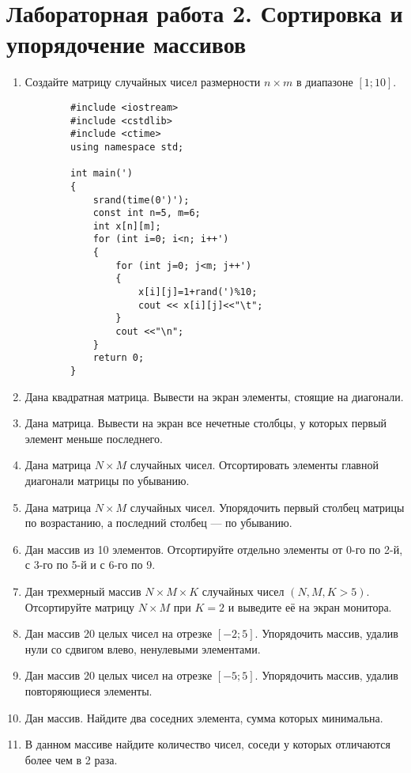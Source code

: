 \section{Лабораторная работа 2. Сортировка и упорядочение массивов}
\begin{enumerate}[leftmargin=*]
    \item Создайте матрицу случайных чисел размерности $n \times m$ в диапазоне $[1;10]$.
    \begin{lstlisting}
        #include <iostream>
        #include <cstdlib>
        #include <ctime>
        using namespace std;

        int main(')
        {
            srand(time(0')');
            const int n=5, m=6;
            int x[n][m];
            for (int i=0; i<n; i++')
            {
                for (int j=0; j<m; j++')
                {
                    x[i][j]=1+rand(')%10;
                    cout << x[i][j]<<"\t";
                }
                cout <<"\n";
            }
            return 0;
        }
    \end{lstlisting}
    \item Дана квадратная матрица. Вывести на экран элементы, стоящие на диагонали.
    \item Дана матрица. Вывести на экран все нечетные столбцы, у которых первый элемент меньше последнего.
    \item Дана матрица $N\times M$ случайных чисел. Отсортировать элементы главной диагонали матрицы по убыванию.
    \item Дана матрица $N\times M$ случайных чисел. Упорядочить первый столбец матрицы по возрастанию, а последний столбец --- по убыванию.
    \item Дан массив из 10 элементов. Отсортируйте отдельно элементы от 0-го по 2-й, с 3-го по 5-й и с 6-го по 9.
    \item Дан трехмерный массив $N\times M\times K$ случайных чисел $(N, M, K>5)$. Отсортируйте матрицу $N\times M$ при $K=2$ и выведите её на экран монитора.
    \item Дан массив 20 целых чисел на отрезке $[-2;5]$. Упорядочить массив, удалив нули со сдвигом влево, ненулевыми элементами.
    \item Дан массив 20 целых чисел на отрезке $[-5;5]$. Упорядочить массив, удалив повторяющиеся элементы.
    \item Дан массив. Найдите два соседних элемента, сумма которых минимальна.
    \item В данном массиве найдите количество чисел, соседи у которых отличаются более чем в 2 раза.
\end{enumerate}
